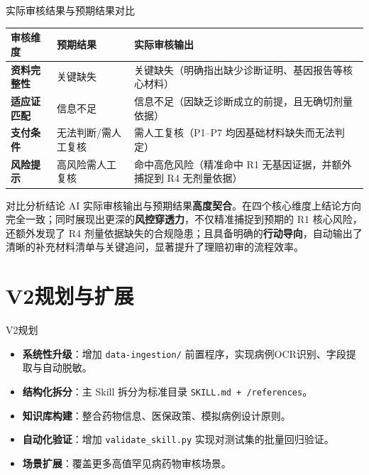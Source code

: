 \documentclass{beamer}
\begin{document}
\begin{frame}[fragile]{实际审核结果与预期结果对比}
    \footnotesize
    \begin{tabularx}{\textwidth}{ >{\hsize=0.2\hsize}l >{\hsize=0.3\hsize}l >{\hsize=0.5\hsize}X }
        \toprule
        \textbf{审核维度} & \textbf{预期结果} & \textbf{实际审核输出} \\
        \midrule
        \textbf{资料完整性} & 关键缺失 & 关键缺失（明确指出缺少诊断证明、基因报告等核心材料） \\
        \textbf{适应证匹配} & 信息不足 & 信息不足（因缺乏诊断成立的前提，且无确切剂量依据） \\
        \textbf{支付条件} & 无法判断/需人工复核 & 需人工复核（P1–P7 均因基础材料缺失而无法判定） \\
        \textbf{风险提示} & 高风险需人工复核 & 命中高危风险（精准命中 R1 无基因证据，并额外捕捉到 R4 无剂量依据） \\
        \bottomrule
    \end{tabularx}
    
    \vspace{0.4cm}
    \begin{block}{对比分析结论}
        AI 实际审核输出与预期结果\textbf{高度契合}。在四个核心维度上结论方向完全一致；同时展现出更深的\textbf{风控穿透力}，不仅精准捕捉到预期的 R1 核心风险，还额外发现了 R4 剂量依据缺失的合规隐患；且具备明确的\textbf{行动导向}，自动输出了清晰的补充材料清单与关键追问，显著提升了理赔初审的流程效率。
    \end{block}
\end{frame}



\section{V2规划与扩展}
\begin{frame}[fragile]{V2规划}
  \begin{itemize}
    \item \textbf{系统性升级}：增加 \texttt{data-ingestion/} 前置程序，实现病例OCR识别、字段提取与自动脱敏。
    \item \textbf{结构化拆分}：主 Skill 拆分为标准目录 \texttt{SKILL.md + /references}。
    \item \textbf{知识库构建}：整合药物信息、医保政策、模拟病例设计原则。
    \item \textbf{自动化验证}：增加 \texttt{validate\_skill.py} 实现对测试集的批量回归验证。
    \item \textbf{场景扩展}：覆盖更多高值罕见病药物审核场景。
  \end{itemize}
\end{frame}
\end{document}
